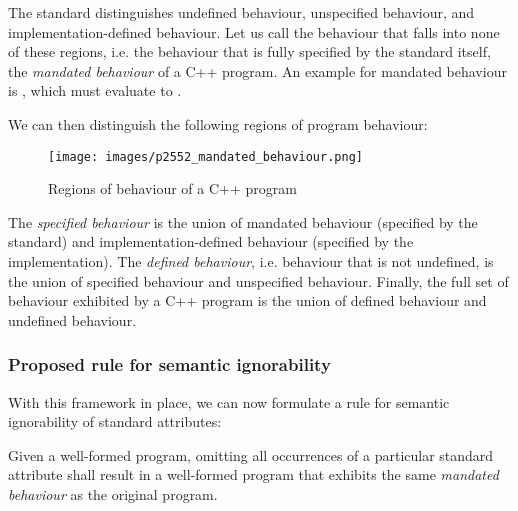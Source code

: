 The standard distinguishes undefined behaviour, unspecified behaviour, and implementation-defined behaviour. Let us call the behaviour that falls into none of these regions, i.e. the behaviour that is fully specified by the standard itself, the \emph{mandated behaviour} of a C++ program. An example for mandated behaviour is , which must evaluate to .

We can then distinguish the following regions of program behaviour:

\begin{figure}[!htbp]
  \texttt{[image: images/p2552\_mandated\_behaviour.png]}
  \centering
  \caption{Regions of behaviour of a C++ program}
  \label{fig:behaviour}
\end{figure}

The \emph{specified behaviour} is the union of mandated behaviour (specified by the standard) and implementation-defined behaviour (specified by the implementation). The \emph{defined behaviour}, i.e. behaviour that is not undefined, is the union of specified behaviour and unspecified behaviour. Finally, the full set of behaviour exhibited by a C++ program is the union of defined behaviour and undefined behaviour.

\subsubsection{Proposed rule for semantic ignorability}
\label{subsubsec:semanticrule}
With this framework in place, we can now formulate a rule for semantic ignorability of standard attributes:

\begin{adjustwidth}{0.5cm}{0.5cm}
Given a well-formed program, omitting all occurrences of a particular standard attribute shall result in a well-formed program that exhibits the same \emph{mandated behaviour} as the original program.
\end{adjustwidth}

